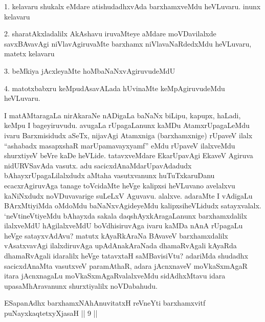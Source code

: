 \begin{artha}
1. kelavaru shukalx eMdare atishudadhxvAda barxhamxveMdu heVLuvaru. inunx kelavaru

2. sharatAkxladalilx AkAshavu iruvaMteye aMdare moVDavilalxde savxBAvavAgi niVlavAgiruvaMte barxhamx niVlavaNaRdedxMdu heVLuvaru, matetx kelavaru 

3. beMkiya jAcxleyaMte hoMbaNaNxvAgiruvudeMdU

4. matotxbabxru keMpudAsavALada hUvinaMte keMpAgiruvudeMdu heVLuvaru.

I matAMtaragaLa nirAkaraNe \ndash  nADigaLa baNaNx biLipu, kapupx, haLadi, keMpu I bageyiruvudu. avugaLa rUpagaLanunx kaMDu AtamxrUpagaLeMdu ivaru Barxmisidudx aSeTx, nijavAgi Atamxniga (barxhamxnige) rUpaveV ilalx ``ashabadx masapxshaR marUpamavayxyamf'' eMdu rUpaveV ilalxveMdu shurxtiyeV beVre kaDe heVLide. tatavxveMdare EkarUpavAgi EkaveV Agiruva nidURVSavAda vasutx. adu sacicxdAnaMdarUpavAdadudx bAhayxrUpagaLilalxdudx aMtaha vasutxvanunx huTuTxkaruDanu ecacxrAgiruvAga tanage toVcidaMte heVge kalipxsi heVLuvano avelalxvu kaNiNxdudx noVDuvavarige suLeLxV Aguvavu. alalxve. adaraMte I vAdigaLu BArxMtiyiMda oMdoMdu baNaNxvAgideyeMdu kalipxsiheVLidudx satayxvalalx. `neVtineVtiyeMdu bAhayxda sakala daqshAyxkAragaLanunx barxhamxdalilx ilalxveMdU hAgilalxveMdU boVdhisiruvAga ivaru kaMDa nAnA rUpagaLu heVge satayxvAdAvu? matutx kAyaRkAraNa BAvaveV barxhamxdalilx vAsatxvavAgi ilalxdiruvAga upAdAnakAraNada dhamaRvAgali kAyaRda dhamaRvAgali idaralilx heVge tatavxtaH saMBavisiVtu? adariMda shudadhx sacicxdAnaMta vasutxveV paramAthaR, adara jAcnxnaveV moVkaSxmAgaR itara jAcnxnagaLu moVkaSxmAgaRvalalxveMdu sidAdhxMtavu \ndash  idara upasaMhAravanunx shurxtiyalilx noVDabahudu.
\end{artha}

\begin{shl}
ESapanAdhx barxhamxNAhAnuvitatxH reVneYti barxhamxvitf puNayxkaqtetxyXjasaH || 9 ||
\end{shl}

